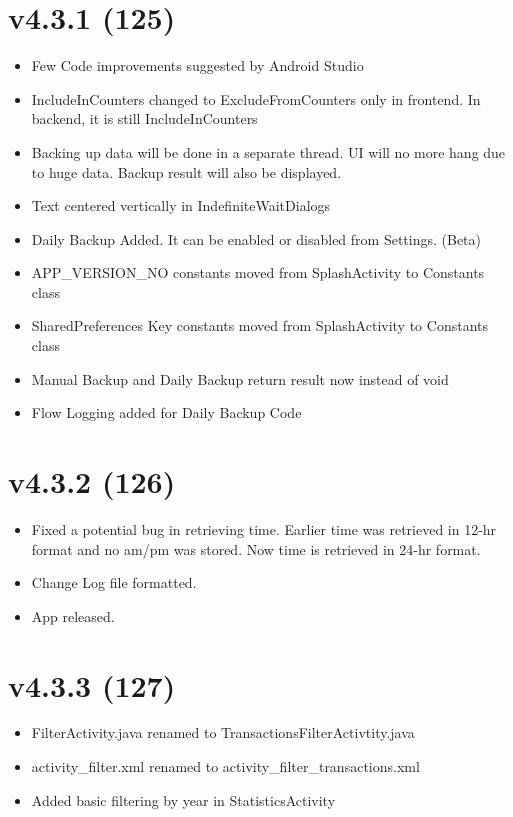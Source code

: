 \documentclass{article}
\begin{document}
\section{v4.3.1 (125)}
\begin{itemize}
\item Few Code improvements suggested by Android Studio
\item IncludeInCounters changed to ExcludeFromCounters only in frontend. In backend, it is still IncludeInCounters
\item Backing up data will be done in a separate thread. UI will no more hang due to huge data. Backup result will also be displayed.
\item Text centered vertically in IndefiniteWaitDialogs
\item Daily Backup Added. It can be enabled or disabled from Settings. (Beta)
\item APP\_VERSION\_NO constants moved from SplashActivity to Constants class
\item SharedPreferences Key constants moved from SplashActivity to Constants class
\item Manual Backup and Daily Backup return result now instead of void
\item Flow Logging added for Daily Backup Code
\end{itemize}

\section{v4.3.2 (126)}
\begin{itemize}
\item Fixed a potential bug in retrieving time. Earlier time was retrieved in 12-hr format and no am/pm was stored. Now time is retrieved in 24-hr format.
\item Change Log file formatted.
\item App released.
\end{itemize}

\section{v4.3.3 (127)}
\begin{itemize}
\item FilterActivity.java renamed to TransactionsFilterActivtity.java
\item activity\_filter.xml renamed to activity\_filter\_transactions.xml
\item Added basic filtering by year in StatisticsActivity
\end{itemize}
\end{document}
